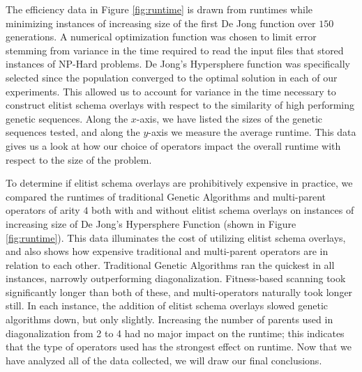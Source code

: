 The efficiency data in Figure \ref{fig:runtime} is drawn from runtimes while minimizing instances of increasing size of the first De Jong function over $150$ generations. A numerical optimization function was chosen to limit error stemming from variance in the time required to read the input files that stored instances of NP-Hard problems. De Jong's Hypersphere function was specifically selected since the population converged to the optimal solution in each of our experiments. This allowed us to account for variance in the time necessary to construct elitist schema overlays with respect to the similarity of high performing genetic sequences. Along the $x$-axis, we have listed the sizes of the genetic sequences tested, and along the $y$-axis we measure the average runtime. This data gives us a look at how our choice of operators impact the overall runtime with respect to the size of the problem. 

To determine if elitist schema overlays are prohibitively expensive in practice, we compared the runtimes of traditional Genetic Algorithms and multi-parent operators of arity $4$ both with and without elitist schema overlays on instances of increasing size of De Jong's Hypersphere Function (shown in Figure \ref{fig:runtime}). This data illuminates the cost of utilizing elitist schema overlays, and also shows how expensive traditional and multi-parent operators are in relation to each other. Traditional Genetic Algorithms ran the quickest in all instances, narrowly outperforming diagonalization. Fitness-based scanning took significantly longer than both of these, and multi-operators naturally took longer still. In each instance, the addition of elitist schema overlays slowed genetic algorithms down, but only slightly. Increasing the number of parents used in diagonalization from 2 to 4 had no major impact on the runtime; this indicates that the type of operators used has the strongest effect on runtime. Now that we have analyzed all of the data collected, we will draw our final conclusions.